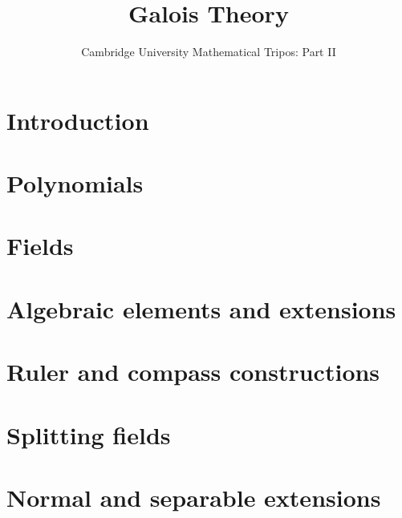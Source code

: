 \documentclass{article}
\title{Galois Theory}
\author{Cambridge University Mathematical Tripos: Part II}
\begin{document}
\maketitle

\tableofcontentsnewpage{}

\section{Introduction}

\section{Polynomials}

\section{Fields}

\section{Algebraic elements and extensions}

\section{Ruler and compass constructions}

\section{Splitting fields}

\section{Normal and separable extensions}

\end{document}

